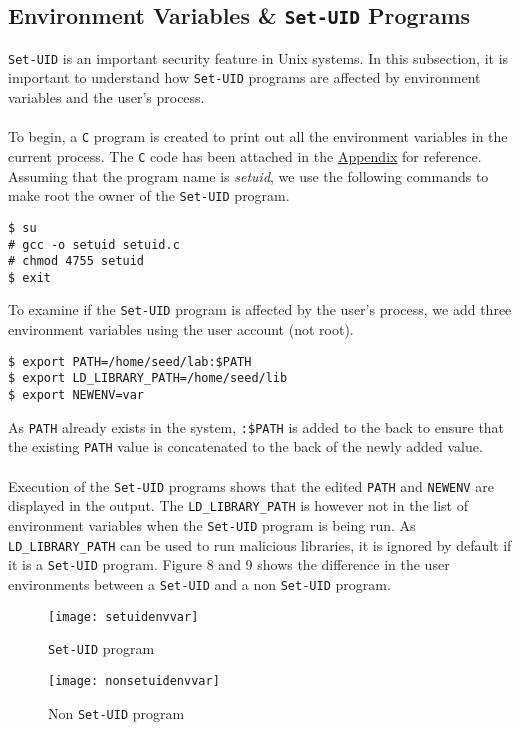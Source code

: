 \documentclass[a4paper,12pt]{article}
\begin{document}
\subsection{Environment Variables \& \texttt{Set-UID} Programs}
\texttt{Set-UID} is an important security feature in Unix systems. In this subsection, it is important to understand how \texttt{Set-UID} programs are affected by environment variables and the user's process.\\\\To begin, a \texttt{C} program is created to print out all the environment variables in the current process. The \texttt{C} code has been attached in the \hyperref[Appsec:3.5]{Appendix} for reference. Assuming that the program name is \textit{setuid}, we use the following commands to make root the owner of the \texttt{Set-UID} program.
\begin{verbatim}
$ su
# gcc -o setuid setuid.c
# chmod 4755 setuid
$ exit
\end{verbatim}
To examine if the \texttt{Set-UID} program is affected by the user's process, we add three environment variables using the user account (not root).
\begin{verbatim}
$ export PATH=/home/seed/lab:$PATH
$ export LD_LIBRARY_PATH=/home/seed/lib
$ export NEWENV=var
\end{verbatim}
As \texttt{PATH} already exists in the system, \texttt{:\$PATH} is added to the back to ensure that the existing \texttt{PATH} value is concatenated to the back of the newly added value.\\\\Execution of the \texttt{Set-UID} programs shows that the edited \texttt{PATH} and \texttt{NEWENV} are displayed in the output. The \texttt{LD\_LIBRARY\_PATH} is however not in the list of environment variables when the \texttt{Set-UID} program is being run. As \texttt{LD\_LIBRARY\_PATH} can be used to run malicious libraries, it is ignored by default if it is a \texttt{Set-UID} program. Figure 8 and 9 shows the difference in the user environments between a \texttt{Set-UID} and a non \texttt{Set-UID} program.
\begin{figure}[!h]
	\centering
	\begin{minipage}{0.5\linewidth}
		\centering
		\texttt{[image: setuidenvvar]}
		\caption{\texttt{Set-UID} program}
		\label{fig:setuidenvvar}
	\end{minipage}%
	\begin{minipage}{0.5\linewidth}
		\centering
		\texttt{[image: nonsetuidenvvar]}
		\caption{Non \texttt{Set-UID} program}
		\label{fig:nonsetuidenvvar}
	\end{minipage}
\end{figure}
\end{document}
